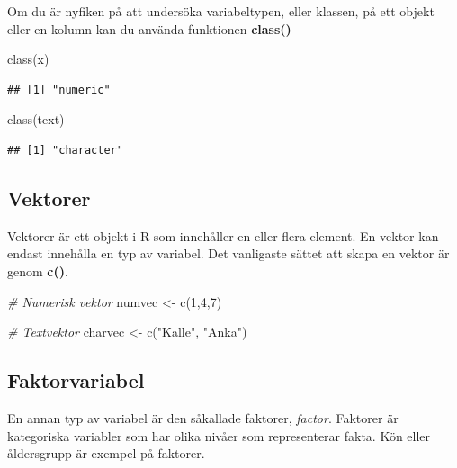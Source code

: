 \documentclass[
]{book}
\newenvironment{Shaded}{\begin{snugshade}}{\end{snugshade}}
\newcommand{\CommentTok}[1]{\textcolor[rgb]{0.56,0.35,0.01}{\textit{#1}}}
\newcommand{\DecValTok}[1]{\textcolor[rgb]{0.00,0.00,0.81}{#1}}
\newcommand{\FunctionTok}[1]{\textcolor[rgb]{0.00,0.00,0.00}{#1}}
\newcommand{\NormalTok}[1]{#1}
\newcommand{\OtherTok}[1]{\textcolor[rgb]{0.56,0.35,0.01}{#1}}
\newcommand{\StringTok}[1]{\textcolor[rgb]{0.31,0.60,0.02}{#1}}
\begin{document}
Om du är nyfiken på att undersöka variabeltypen, eller klassen, på ett objekt eller en kolumn kan du använda funktionen \textbf{class()}

\begin{Shaded}
\begin{Highlighting}[]
\FunctionTok{class}\NormalTok{(x)}
\end{Highlighting}
\end{Shaded}

\begin{verbatim}
## [1] "numeric"
\end{verbatim}

\begin{Shaded}
\begin{Highlighting}[]
\FunctionTok{class}\NormalTok{(text)}
\end{Highlighting}
\end{Shaded}

\begin{verbatim}
## [1] "character"
\end{verbatim}

\hypertarget{vektorer}{%
\subsection{Vektorer}\label{vektorer}}

Vektorer är ett objekt i R som innehåller en eller flera element. En vektor kan endast innehålla en typ av variabel. Det vanligaste sättet att skapa en vektor är genom \textbf{c()}.

\begin{Shaded}
\begin{Highlighting}[]
\CommentTok{\# Numerisk vektor}
\NormalTok{numvec }\OtherTok{\textless{}{-}} \FunctionTok{c}\NormalTok{(}\DecValTok{1}\NormalTok{,}\DecValTok{4}\NormalTok{,}\DecValTok{7}\NormalTok{)}

\CommentTok{\# Textvektor}
\NormalTok{charvec }\OtherTok{\textless{}{-}} \FunctionTok{c}\NormalTok{(}\StringTok{"Kalle"}\NormalTok{, }\StringTok{"Anka"}\NormalTok{)}
\end{Highlighting}
\end{Shaded}

\hypertarget{faktorvariabel}{%
\subsection{Faktorvariabel}\label{faktorvariabel}}

En annan typ av variabel är den såkallade faktorer, \emph{factor}. Faktorer är kategoriska variabler som har olika nivåer som representerar fakta. Kön eller åldersgrupp är exempel på faktorer.
\end{document}
